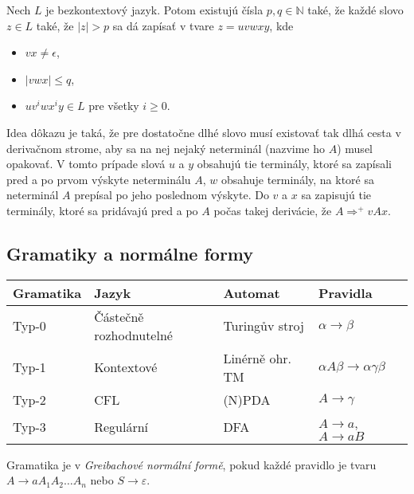 \begin{theorem}
	Nech $L$ je bezkontextový jazyk. Potom existujú čísla $p,q \in \mathbb{N}$
	také, že každé slovo $z \in L$ také, že $|z| > p$ sa dá
	zapísať v tvare $z=uvwxy$, kde
	\begin{itemize}
		\item $vx \neq \epsilon$,
		\item $|vwx| \leq q$,
		\item $uv^iwx^iy \in L$ pre všetky $i \geq 0$.
	\end{itemize}
\end{theorem}

Idea dôkazu je taká, že pre dostatočne dlhé slovo musí existovať
tak dlhá cesta v derivačnom strome, aby sa na nej nejaký 
neterminál (nazvime ho $A$) musel opakovať. V tomto prípade 
slová $u$ a $y$ obsahujú tie terminály, ktoré sa zapísali pred a po 
prvom výskyte neterminálu $A$, $w$ obsahuje terminály, na ktoré
sa neterminál $A$ prepísal po jeho poslednom výskyte.
Do $v$ a $x$ sa zapisujú tie terminály, ktoré sa pridávajú
pred a po $A$ počas takej derivácie, že $A \Rightarrow^+ vAx$.

\subsection{Gramatiky a normálne formy}


\begin{longtable}[]{llll}
\toprule
Gramatika & Jazyk & Automat & Pravidla \tabularnewline
\midrule
\endhead
Typ-0 & Částečně rozhodnutelné & Turingův stroj & $\alpha \rightarrow \beta$ \tabularnewline
Typ-1 & Kontextové & Linérně ohr. TM & $\alpha A \beta \rightarrow \alpha \gamma \beta$ \tabularnewline
Typ-2 & CFL & (N)PDA &	$ A\rightarrow \gamma$ \tabularnewline
Typ-3 & Regulární & DFA & $A \rightarrow a$, $A \rightarrow aB$ \tabularnewline
\bottomrule
\end{longtable}


\bigskip

\begin{definition}
    Gramatika je v {\em Greibachové normální formě}, pokud
    každé pravidlo je tvaru
    $A \to a A_1 A_2 \ldots A_n$ nebo $S \to \varepsilon$.
\end{definition}

